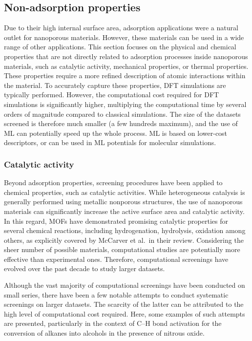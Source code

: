\documentclass[main.tex]{subfiles}
\begin{document}
\subsection{Non-adsorption properties}

Due to their high internal surface area, adsorption applications were a natural outlet for nanoporous materials. However, these materials can be used in a wide range of other applications. This section focuses on the physical and chemical properties that are not directly related to adsorption processes inside nanoporous materials, such as catalytic activity,\autocite{Singh_2015, Greeley_2006, Back_2020}
mechanical properties,\autocite{Chibani_2019, Gaillac_2020}
or thermal properties.\autocite{Toher_2014, Sarikurt_2020, Ducamp_2021} These properties require a more refined description of atomic interactions within the material. To accurately capture these properties, DFT simulations are typically performed. However, the computational cost required for DFT simulations is significantly higher, multiplying the computational time by several orders of magnitude compared to classical simulations. The size of the datasets screened is therefore much smaller (a few hundreds maximum), and the use of ML can potentially speed up the whole process. ML is based on lower-cost descriptors,\autocite{Evans_2017, Ducamp_2022} or can be used in ML potentials for molecular simulations\autocite{Eckhoff_2019,Friederich_2021}.

\subsubsection{Catalytic activity}

Beyond adsorption properties, screening procedures have been applied to chemical properties, such as catalytic activities. While heterogeneous catalysis is generally performed using metallic nonporous structures, the use of nanoporous materials can significantly increase the active surface area and catalytic activity. In this regard, MOFs have demonstrated promising catalytic properties for several chemical reactions, including hydrogenation, hydrolysis, oxidation among others, as explicitly covered by McCarver et al.\ in their review.\autocite{McCarver_2021}
Considering the sheer number of possible materials, computational studies are potentially more effective than experimental ones. Therefore, computational screenings have evolved over the past decade to study larger datasets.

Although the vast majority of computational screenings have been conducted on small series, there have been a few notable attempts to conduct systematic screenings on larger datasets. The scarcity of the latter can be attributed to the high level of computational cost required. Here, some examples of such attempts are presented, particularly in the context of C--H bond activation for the conversion of alkanes into alcohols in the presence of nitrous oxide.
\end{document}
